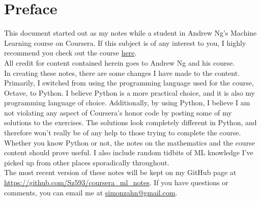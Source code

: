 \chapter*{Preface}

This document started out as my notes while a student in Andrew Ng's Machine Learning course on Coursera. If this subject is of any interest to you, I highly recommend you check out the course \href{https://www.coursera.org/learn/machine-learning}{here}. \\


All credit for content contained herein goes to Andrew Ng and his course. \\

In creating these notes, there are some changes I have made to the content. Primarily, I switched from using the programming language used for the course, Octave, to Python. I believe Python is a more practical choice, and it is also my programming language of choice. Additionally, by using Python, I believe I am not violating any aspect of Coursera's honor code by posting some of my solutions to the exercises. The solutions look completely different in Python, and therefore won't really be of any help to those trying to complete the course. Whether you know Python or not, the notes on the mathematics and the course content should prove useful. I also include random tidbits of ML knowledge I've picked up from other places sporadically throughout. \\

The most recent version of these notes will be kept on my GitHub page at \url{https://github.com/Sz593/coursera_ml_notes}. If you have questions or comments, you can email me at \href{mailto:simonzahn@gmail.com}{simonzahn@gmail.com}.